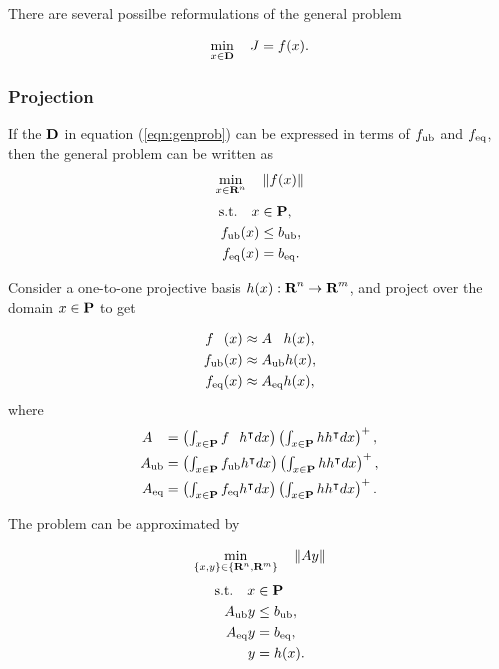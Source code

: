 \documentclass{article}
\begin{document}
There are several possilbe reformulations of the general problem

\begin{align}
    \min_{x\in\textbf{D}} \quad J =f(x)\label{eqn:genprob}.
\end{align}

\subsubsection{Projection}

    If the $\textbf{D}$ in equation (\ref{eqn:genprob}) 
    can be expressed in terms of $f_{\text{ub}}$ and $f_{\text{eq}}$,
    then the general problem can be written as
    \begin{align*}
        \min_{x\in\textbf{R}^n}\quad \|f(x)\|
    \end{align*}
    \begin{align*}
        \text{s.t.}\quad x&\in\textbf{P},\\
        f_{\text{ub}}(x)&\leq b_{\text{ub}},\\
        f_{\text{eq}}(x)&=b_{\text{eq}}.
    \end{align*}

    Consider a one-to-one projective basis $h(x):\textbf{R}^n\to\textbf{R}^m$, 
    and project over the domain $x\in\textbf{P}$ to get

    \begin{align*}
        f_{\phantom{\eq}}(x) & \approx A_{\phantom{\eq}} h(x),\\
        f_\ub(x) & \approx A_\ub h(x),\\
        f_\eq(x) & \approx A_\eq h(x),
    \end{align*}
    where
    \begin{align*}
        A_{\phantom{\eq}}&=\textstyle\left(\int_{x\in\poly} f_{\phantom{\eq}}h^\tp dx\right)\left(\int_{x\in\poly} hh^\tp dx\right)^+,\\
        A_\ub&=\textstyle\left(\int_{x\in\poly} f_\ub h^\tp dx\right)\left(\int_{x\in\poly} hh^\tp dx\right)^+,\\
        A_\eq&=\textstyle\left(\int_{x\in\poly} f_\eq h^\tp dx\right)\left(\int_{x\in\poly} hh^\tp dx\right)^+.
    \end{align*}

    The problem can be approximated by

    \begin{align}
        \min_{\{x,y\}\in\{\textbf{R}^n,\textbf{R}^m\}}\quad \|Ay\|
    \end{align} 
    \begin{align*}
        \text{s.t.}\quad x&\in\textbf{P}\\
        A_{\text{ub}} y&\leq b_{\text{ub}},\\
        A_{\text{eq}} y&=b_{\text{eq}},\\ 
        y&=h(x).
    \end{align*}
\end{document}
